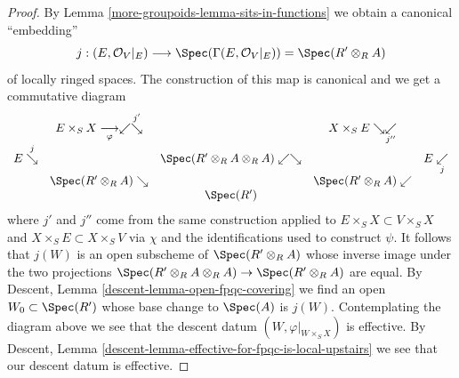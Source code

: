 \begin{proof}
\medskip\noindent
By Lemma \ref{more-groupoids-lemma-sits-in-functions} we obtain a canonical ``embedding''
$$
j : (E, \mathcal{O}_V|_E) \longrightarrow
\Spec(\Gamma(E, \mathcal{O}_V|_E)) = \Spec(R' \otimes_R A)
$$
of locally ringed spaces. The construction of this map is canonical
and we get a commutative diagram
$$
\begin{array}{ccccc} & E \times_S X \underset{\varphi}{\longrightarrow}\swarrow\overset{j'}{\searrow} &  & X \times_S E \searrow\underset{j''}{\swarrow} &  \\ E \overset{j}{\searrow} &  & \Spec(R' \otimes_R A \otimes_R A) \swarrow\searrow &  & E \underset{j}{\swarrow} \\  & \Spec(R' \otimes_R A) \searrow &  & \Spec(R' \otimes_R A) \swarrow &  \\  &  & \Spec(R') &  & \end{array}
$$
where $j'$ and $j''$ come from the same construction applied to
$E \times_S X \subset V \times_S X$ and $X \times_S E \subset X \times_S V$
via $\chi$ and the identifications used to construct $\psi$.
It follows that $j(W)$ is an open subscheme of $\Spec(R' \otimes_R A)$
whose inverse image under the two projections
$\Spec(R' \otimes_R A \otimes_R A) \to \Spec(R' \otimes_R A)$
are equal. By Descent, Lemma \ref{descent-lemma-open-fpqc-covering}
we find an open $W_0 \subset \Spec(R')$ whose base change
to $\Spec(A)$ is $j(W)$. Contemplating the diagram above
we see that the descent datum $(W, \varphi|_{W \times_S X})$
is effective. By Descent, Lemma
\ref{descent-lemma-effective-for-fpqc-is-local-upstairs}
we see that our descent datum is effective.
\end{proof}



